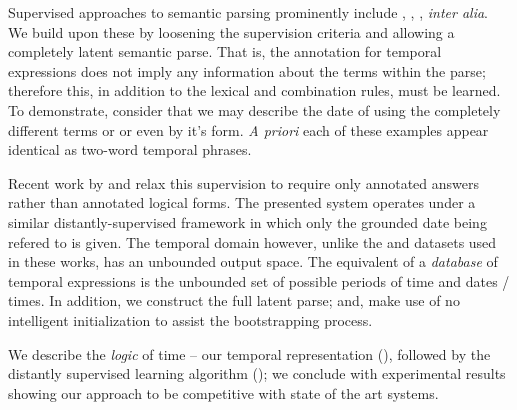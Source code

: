 Supervised approaches to semantic parsing prominently include
	,
	,
	, 
	\textit{inter alia}.
We build upon these by loosening the supervision criteria and allowing a
	completely latent semantic parse.
That is, the annotation for temporal expressions does not imply any information
	about the terms within the parse; therefore this, in addition to the
	lexical and combination rules, must be learned.
To demonstrate, consider that we may describe the date of 
	using the completely different terms  or  or even by it's \tp{[month] [day]} form.
\textit{A priori} each of these examples appear identical as two-word
	temporal phrases.

Recent work by  and 
	 relax this supervision to require only
	annotated answers rather than annotated logical forms.
The presented system operates under a similar distantly-supervised framework
	in which only the grounded date being refered to is given.
The temporal domain however, unlike the  and 
	datasets used in these works, has an unbounded output space.
The equivalent of a \textit{database} of temporal expressions is the
	unbounded set of possible periods of time and dates / times.
In addition, we construct the full latent parse; and, make use of no intelligent
	initialization to assist the bootstrapping process.

We describe the \textit{logic} of time -- our temporal representation
	(), followed by the distantly supervised learning algorithm
	(); we conclude with experimental results showing our
	approach to be competitive with state of the art systems.
